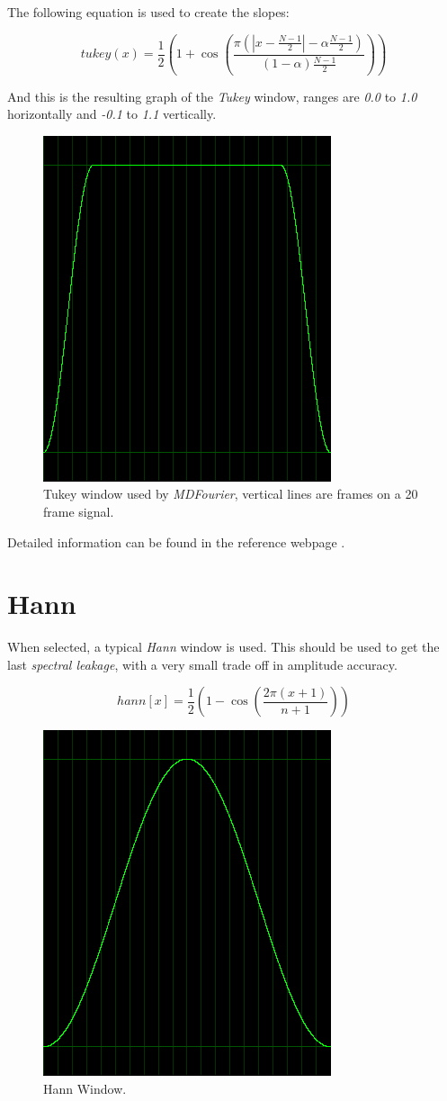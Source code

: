\documentclass[10pt,a4paper]{report}
\begin{document}
\begin{appendices}
The following equation is used to create the slopes:

\begin{equation}
tukey(x)=\frac{1}{2}(1+\cos(\frac{\pi(|x-\frac{N-1}{2}|-\alpha \frac{N-1}{2})}{(1-\alpha)\frac{N-1}{2}}))
\end{equation}

And this is the resulting graph of the \textit{Tukey} window, ranges are \textit{0.0} to \textit{1.0} horizontally and \textit{-0.1} to \textit{1.1} vertically.

\begin{figure}[H]
	\centering
	\includegraphics[width=0.4\linewidth]{images/windows/window-tukey.png}
	\caption[Tukey Window]{Tukey window used by \textit{MDFourier}, vertical lines are frames on a 20 frame signal.}
	\label{fig:window-tukey}
\end{figure}

Detailed information can be found in the reference webpage \cite{tukey}.

\section{Hann}
When selected, a typical \textit{Hann} window is used. This should be used to get the last \textit{spectral leakage}, with a very small trade off in amplitude accuracy.

\begin{equation}
hann[x] = \frac{1}{2}(1 - \cos(\frac{2\pi(x+1)}{n+1}))
\end{equation}

\begin{figure}[H]
	\centering
	\includegraphics[width=0.4\linewidth]{images/windows/window-hann.png}
	\caption[Hann Window]{Hann Window.}
	\label{fig:window-hann}
\end{figure}


\end{appendices}
\end{document}
